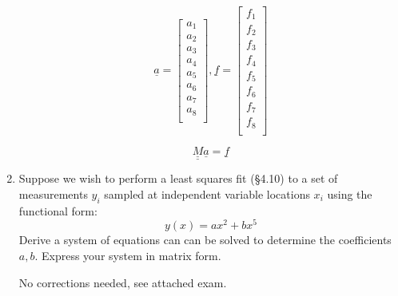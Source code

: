 \documentclass{article}
\begin{document}
\begin{enumerate}
    $$\underline{a} = \begin{bmatrix}
    a_1 \\
    a_2 \\
    a_3 \\
    a_4 \\
    a_5 \\
    a_6 \\
    a_7 \\
    a_8 \\
    \end{bmatrix} , \underline{f} = \begin{bmatrix}
    f_1 \\
    f_2 \\
    f_3 \\
    f_4 \\
    f_5 \\
    f_6 \\
    f_7 \\
    f_8 \\
    \end{bmatrix}$$
    
    $$\underline{\underline{M}} \underline{a} = \underline{f}$$
    
    \pagebreak
    
   \item Suppose we wish to perform a least squares fit (\S 4.10) to a set of measurements $y_i$ sampled at independent variable locations $x_i$ using the functional form:  
    \begin{equation}
      y(x) = a x^2 + b x^5
    \end{equation}
    Derive a system of equations can can be solved to determine the coefficients $a,b$.  Express your system in matrix form.  
     
    \bigskip
    
    \bigskip
    
    No corrections needed, see attached exam.
    
\end{enumerate}
\end{document}
